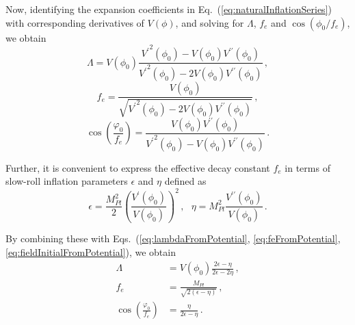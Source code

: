 \documentclass[12pt]{article}
\begin{document}
Now, identifying the expansion coefficients in Eq.~(\ref{eq:naturalInflationSeries}) with corresponding derivatives of $V\left(\phi\right)$, and solving for $\Lambda$, $f_e$ and $\cos\left(\phi_0 / f_e\right)$, we obtain
\begin{equation} \label{eq:lambdaFromPotential}
  \Lambda = V\left(\phi_0\right) \frac
    {{V^\prime}^2\left(\phi_0\right) - V\left(\phi_0\right) V^{\prime\prime}\left(\phi_0\right)}
    {{V^\prime}^2\left(\phi_0\right) - 2 V\left(\phi_0\right) V^{\prime\prime}\left(\phi_0\right)}
  \,,
\end{equation}
\begin{equation} \label{eq:feFromPotential}
  f_e = \frac
    {V\left(\phi_0\right)}
    {\sqrt{{V^\prime}^2\left(\phi_0\right)
      - 2 V\left(\phi_0\right) V^{\prime\prime}\left(\phi_0\right)}}\,,
\end{equation}
\begin{equation} \label{eq:fieldInitialFromPotential}
  \cos\left(\frac{\varphi_0}{f_e}\right) = \frac
    {V\left(\phi_0\right) V^{\prime\prime}\left(\phi_0\right)}
    {{V^\prime}^2\left(\phi_0\right) - V\left(\phi_0\right) V^{\prime\prime}\left(\phi_0\right)}\,.
\end{equation}

Further, it is convenient to express the effective decay constant $f_e$ in terms of slow-roll inflation parameters $\epsilon$ and $\eta$ defined as
\begin{equation} \label{eq:epsEtaFromPotential}
  \epsilon =
    \frac{M_{Pl}^2}{2}
    \left(\frac{V^\prime\left(\phi_0\right)}{V\left(\phi_0\right)}\right)^2\,,
  ~~~ \eta = M_{Pl}^2 \frac{V^{\prime\prime}\left(\phi_0\right)}{V\left(\phi_0\right)}\,.
\end{equation}

By combining these with Eqs.~(\ref{eq:lambdaFromPotential}, \ref{eq:feFromPotential}, \ref{eq:fieldInitialFromPotential}), we obtain
\begin{align} %
  \label{eq:lambdaSlowRoll}
  \Lambda &= V\left(\phi_0\right) \frac{2 \epsilon - \eta}{2 \epsilon - 2 \eta}\,,\\
  \label{eq:feSlowRoll}
  f_e &= \frac{M_{Pl}}{\sqrt{2 \left(\epsilon - \eta\right)}}\,,\\
  \label{eq:fieldInitialSlowRoll}
  \cos\left(\frac{\varphi_0}{f_e}\right) &= \frac{\eta}{2 \epsilon - \eta}\,.
\end{align}
\end{document}

